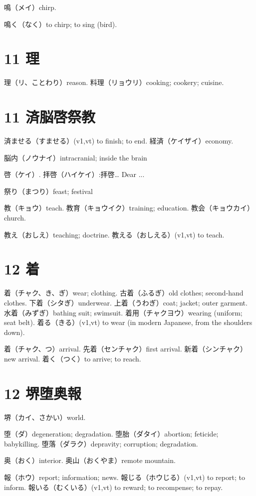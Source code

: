 鳴（メイ）chirp.

鳴く（なく）to chirp; to sing (bird).

\section{11 理}

理（リ、ことわり）reason.
料理（リョウリ）cooking; cookery; cuisine.

\section{11 済脳啓祭教}

済ませる（すませる）(v1,vt) to finish; to end.
経済（ケイザイ）economy.

脳内（ノウナイ）intracranial; inside the brain

啓（ケイ）.
拝啓（ハイケイ）:拝啓… Dear ...

祭り（まつり）feast; festival

教（キョウ）teach.
教育（キョウイク）training; education.
教会（キョウカイ）church.

教え（おしえ）teaching; doctrine.
教える（おしえる）(v1,vt) to teach.

\section{12 着}

着（チャク、き、ぎ）wear; clothing.
古着（ふるぎ）old clothes; second-hand clothes.
下着（シタぎ）underwear.
上着（うわぎ）coat; jacket; outer garment.
水着（みずぎ）bathing suit; swimsuit.
着用（チャクヨウ）wearing (uniform; seat belt).
着る（きる）(v1,vt) to wear (in modern Japanese, from the shoulders down).

着（チャク、つ）arrival.
先着（センチャク）first arrival.
新着（シンチャク）new arrival.
着く（つく）to arrive; to reach.

\section{12 堺堕奥報}

堺（カイ、さかい）world.

堕（ダ）degeneration; degradation.
堕胎（ダタイ）abortion; feticide; babykilling.
堕落（ダラク）depravity; corruption; degradation.

奥（おく）interior.
奥山（おくやま）remote mountain.

報（ホウ）report; information; news.
報じる（ホウじる）(v1,vt) to report; to inform.
報いる（むくいる）(v1,vt) to reward; to recompense; to repay.

